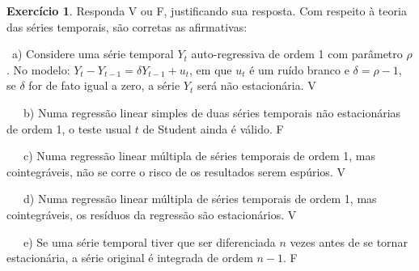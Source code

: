 \documentclass[
]{book}
\theoremstyle{definition}
\theoremstyle{definition}
\theoremstyle{definition}
\newtheorem{exercise}{Exercício}[chapter]
\theoremstyle{remark}
\begin{document}
\begin{exercise}
\protect\hypertarget{exr:exervf5}{}{\label{exr:exervf5} }Responda V ou F, justificando sua resposta. Com respeito à teoria das séries temporais, são corretas as afirmativas:

~a) Considere uma série temporal \(Y_t\) auto-regressiva de ordem 1 com parâmetro \(\rho\). No modelo: \(Y_t - Y_{t-1} = \delta Y_{t-1} + u_t\), em que \(u_t\) é um ruído branco e \(\delta = \rho - 1\), se \(\delta\) for de fato igual a zero, a série \(Y_t\) será não estacionária. V

~~~b) Numa regressão linear simples de duas séries temporais não estacionárias de ordem 1, o teste usual \(t\) de Student ainda é válido. F

~~~c) Numa regressão linear múltipla de séries temporais de ordem 1, mas cointegráveis, não se corre o risco de os resultados serem espúrios. V

~~~d) Numa regressão linear múltipla de séries temporais de ordem 1, mas cointegráveis, os resíduos da regressão são estacionários. V

~~~e) Se uma série temporal tiver que ser diferenciada \(n\) vezes antes de se tornar estacionária, a série original é integrada de ordem \(n-1\). F
\end{exercise}
\end{document}
